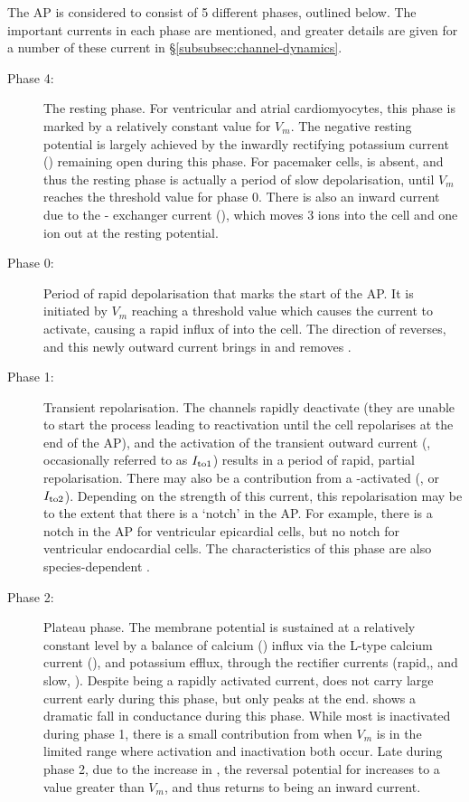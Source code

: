 \documentclass[../thesis-main.tex]{subfiles}
\begin{document}
 The AP is considered to consist of 5 different phases, outlined below. The important currents in each phase are mentioned, and greater details are given for a number of these current in \S\ref{subsubsec:channel-dynamics}.
 \begin{description}
  \item[Phase 4:] The resting phase. For ventricular and atrial cardiomyocytes, this phase is marked by a relatively constant value for $V_m$. The negative resting potential is largely achieved by the inwardly rectifying potassium current (\ikix{}) remaining open during this phase. For pacemaker cells, \ikix{} is absent, and thus the resting phase is actually a period of slow depolarisation, until $V_m$ reaches the threshold value for phase 0. There is also an inward current due to the \na{}-\ca{} exchanger current (\inaca), which moves 3 \na{} ions into the cell and one \ca{} ion out at the resting potential.
  \item[Phase 0:] Period of rapid depolarisation that marks the start of the AP. It is initiated by $V_m$ reaching a threshold value which causes the \ina{} current to activate, causing a rapid influx of \na{} into the cell. The direction of \inaca{} reverses, and this newly outward current brings in \ca{} and removes \na{}.
  \item[Phase 1:] Transient repolarisation. The \na{} channels rapidly deactivate (they are unable to start the process leading to reactivation until the cell repolarises at the end of the AP), and the activation of the transient \K{} outward current (\ito{}, occasionally referred to as $I_{\textnormal{to1}}$) results in a period of rapid, partial repolarisation. There may also be a contribution from a \ca{}-activated \cl (\icacl, or $I_{\textnormal{to2}}$). Depending on the strength of this current, this repolarisation may be to the extent that there is a `notch' in the AP. For example, there is a notch in the AP for ventricular epicardial cells, but no notch for ventricular endocardial cells. The characteristics of this phase are also species-dependent \citep{Carmeliet2006}.
  \item[Phase 2:] Plateau phase. The membrane potential is sustained at a relatively constant level by a balance of calcium (\ca{}) influx via the L-type calcium current (\ica{}), and potassium efflux, through the rectifier \K{} currents (rapid,\ikr{}, and slow, \iks{}). Despite being a rapidly activated current, \ikr{} does not carry large current early during this phase, but only peaks at the end. \ikix{} shows a dramatic fall in conductance during this phase. While most \ina{} is inactivated during phase 1, there is a small contribution from \ina{} when $V_m$ is in the limited range where activation and inactivation both occur. Late during phase 2, due to the increase in \cai{}, the reversal potential for \inaca{} increases to a value greater than $V_m$, and thus \inaca{} returns to being an inward current.

\end{description}
\end{document}
